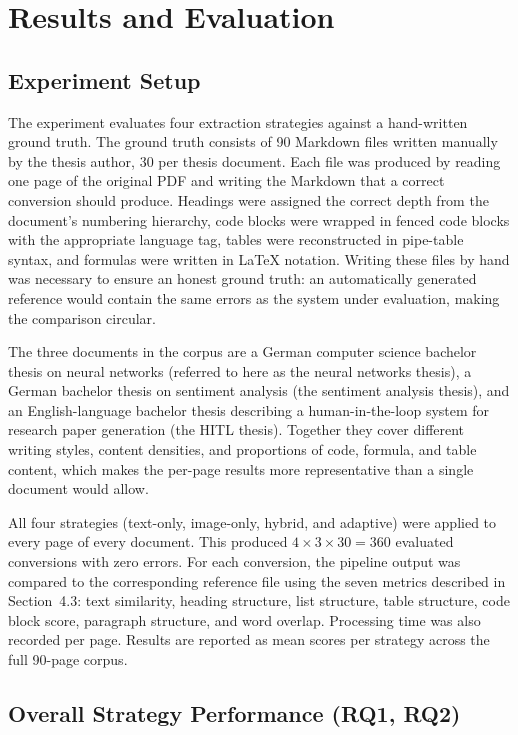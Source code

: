 \chapter{Results and Evaluation}

\section{Experiment Setup}

The experiment evaluates four extraction strategies against a
hand-written ground truth. The ground truth consists of 90 Markdown
files written manually by the thesis author, 30 per thesis document.
Each file was produced by reading one page of the original PDF and
writing the Markdown that a correct conversion should produce.
Headings were assigned the correct depth from the document's numbering
hierarchy, code blocks were wrapped in fenced code blocks with the
appropriate language tag, tables were reconstructed in pipe-table
syntax, and formulas were written in LaTeX notation.
Writing these files by hand was necessary to ensure an honest ground
truth: an automatically generated reference would contain the same
errors as the system under evaluation, making the comparison circular.

The three documents in the corpus are a German computer science
bachelor thesis on neural networks (referred to here as the neural
networks thesis), a German bachelor thesis on sentiment analysis
(the sentiment analysis thesis), and an English-language bachelor
thesis describing a human-in-the-loop system for research paper
generation (the HITL thesis). Together they cover different writing
styles, content densities, and proportions of code, formula, and
table content, which makes the per-page results more representative
than a single document would allow.

All four strategies (text-only, image-only, hybrid, and adaptive) were
applied to every page of every document. This produced
$4 \times 3 \times 30 = 360$ evaluated conversions with zero errors.
For each conversion, the pipeline output was compared to the
corresponding reference file using the seven metrics described in
Section~4.3: text similarity, heading structure, list structure,
table structure, code block score, paragraph structure, and word
overlap. Processing time was also recorded per page.
Results are reported as mean scores per strategy across the full
90-page corpus.

\section{Overall Strategy Performance (RQ1, RQ2)}

